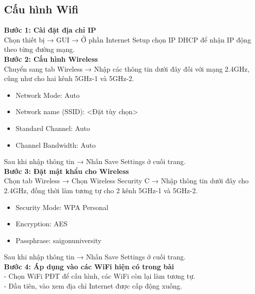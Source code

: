 \documentclass[12pt, a4paper]{article}
\begin{document}
	\subsection{Cấu hình Wifi}
	\begin{flushleft}
		\textbf{Bước 1: Cài đặt địa chỉ IP} \\
		\hspace{1cm}Chọn thiết bị → GUI → Ở phần Internet Setup chọn IP DHCP để nhận IP động theo từng đường mạng.\\
		\textbf{Bước 2: Cấu hình Wireless}\\
		 \hspace{1cm}Chuyển sang tab Wireless → Nhập các thông tin dưới đây đối với mạng 2.4GHz, cũng như cho hai kênh 5GHz-1 và 5GHz-2.
		\begin{itemize}[leftmargin=1.75cm, itemsep=0pt, topsep=0pt]
			\item Network Mode: Auto
			\item Network name (SSID): <Đặt tùy chọn>
			\item Standard Channel: Auto
			\item Channel Bandwidth: Auto
		\end{itemize}
		\hspace{1cm}Sau khi nhập thông tin → Nhấn Save Settings ở cuối trang.\\
		\textbf{Bước 3: Đặt mật khẩu cho Wireless}\\
		\hspace{1cm}Chọn tab Wireless → Chọn Wireless Security C → Nhập thông tin dưới đây cho 2.4GHz, đồng thời làm tương tự cho 2 kênh 5GHz-1 và 5GHz-2. 
		\begin{itemize}[leftmargin=1.75cm, itemsep=0pt, topsep=0pt]
			\item Security Mode: WPA Personal
			\item Encryption: AES
			\item Passphrase: saigonuniversity
		\end{itemize}
		\hspace{1cm}Sau khi nhập thông tin → Nhấn Save Settings ở cuối trang.\\
		\newpage
		\textbf{Bước 4: Áp dụng vào các WiFi hiện có trong bài}
		\\- Chọn WiFi PĐT để cấu hình, các WiFi còn lại làm tương tự.
		\\- Đầu tiên, vào xem địa chỉ Internet được cấp động xuống.
		\begin{figure}[H]
			\centering

\end{figure}
\end{flushleft}
\end{document}
